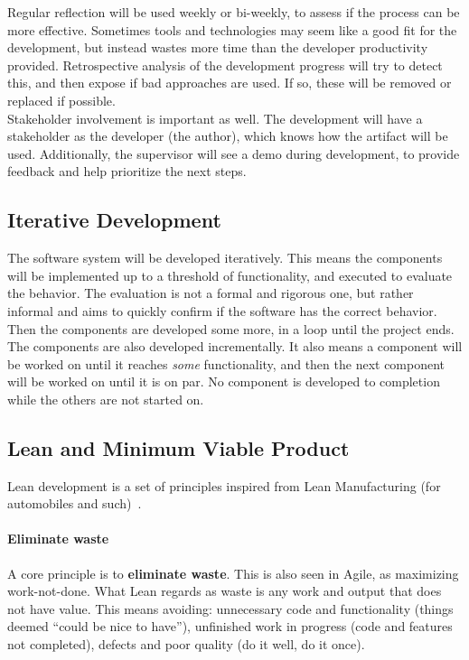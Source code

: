 Regular reflection will be used weekly or bi-weekly, to assess if the process can be more effective.
Sometimes tools and technologies may seem like a good fit for the development, but instead wastes more time than the developer productivity provided.
Retrospective analysis of the development progress will try to detect this, and then expose if bad approaches are used.
If so, these will be removed or replaced if possible.\\

Stakeholder involvement is important as well.
The development will have a stakeholder as the developer (the author), which knows how the artifact will be used.
Additionally, the supervisor will see a demo during development, to provide feedback and help prioritize the next steps.


\subsection{Iterative Development}

The software system will be developed iteratively.
This means the components will be implemented up to a threshold of functionality, and executed to evaluate the behavior.
The evaluation is not a formal and rigorous one, but rather informal and aims to quickly confirm if the software has the correct behavior.
Then the components are developed some more, in a loop until the project ends.\\

The components are also developed incrementally.
It also means a component will be worked on until it reaches \textit{some} functionality, and then the next component will be worked on until it is on par.
No component is developed to completion while the others are not started on.


\subsection{Lean and Minimum Viable Product}

Lean development is a set of principles inspired from Lean Manufacturing (for automobiles and such)~\cite{rachellelynnGuidingPrinciplesLean}.


\paragraph{Eliminate waste}
A core principle is to \textbf{eliminate waste}.
This is also seen in Agile, as maximizing work-not-done.
What Lean regards as waste is any work and output that does not have value.
This means avoiding: unnecessary code and functionality (things deemed ``could be nice to have''), unfinished work in progress (code and features not completed), defects and poor quality (do it well, do it once).


